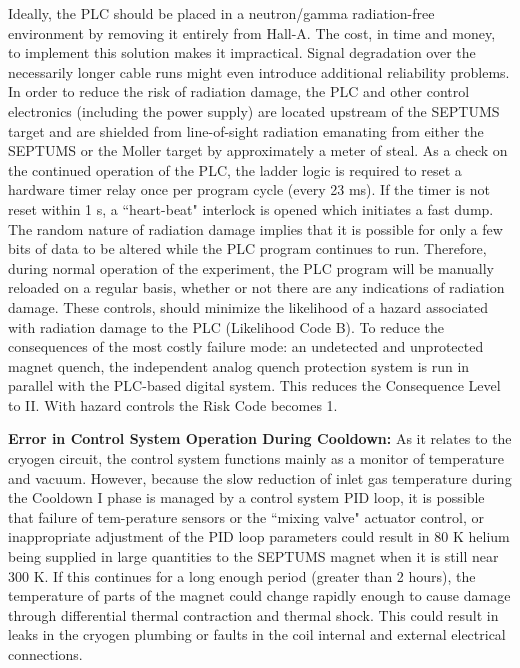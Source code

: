 {Ideally, the PLC should be placed in a neutron/gamma radiation-free environment by removing it entirely 
from Hall-A.  The cost, in time and money, to implement this solution makes it impractical.  Signal 
degradation over the necessarily longer cable runs might even introduce additional reliability problems.  
In order to reduce the risk of radiation damage, the PLC and other control electronics (including 
the power supply) are located upstream of the SEPTUMS target and are shielded from line-of-sight radiation 
emanating from either the SEPTUMS or the Moller target by approximately a meter of steal.  As a check on 
the continued operation of the PLC, the ladder logic is required to reset a hardware timer relay once per 
program cycle (every 23 ms).  If the timer is not reset within 1 s, a ``heart-beat" interlock is opened which 
initiates a fast dump.  The random nature of radiation damage implies that it is possible for only a few bits 
of data to be altered while the PLC program continues to run.  Therefore, during normal operation of the 
experiment, the PLC program will be manually reloaded on a regular basis, whether or not there are any 
indications of radiation damage.  These controls, should minimize the likelihood of a hazard associated 
with radiation damage to the PLC (Likelihood Code B).  To reduce the consequences of the most costly 
failure mode: an undetected and unprotected magnet quench, the independent analog quench protection system 
is run in parallel with the PLC-based digital system.  This reduces the Consequence Level to II. With 
hazard controls the Risk Code becomes 1.

{\bf Error in Control System Operation During Cooldown:}
As it relates to the cryogen circuit, the control system functions mainly as a monitor of temperature and 
vacuum.  However, because the slow reduction of inlet gas temperature during the Cooldown I phase is managed 
by a control system PID loop, it is possible that failure of tem-perature sensors or the ``mixing valve" 
actuator control, or inappropriate adjustment of the PID loop parameters could result in 80 K helium being 
supplied in large quantities to the SEPTUMS magnet when it is still near 300 K.  If this continues for a 
long enough period (greater than 2 hours), the temperature of parts of the magnet could change rapidly 
enough to cause damage through differential thermal contraction and thermal shock.  This could result in 
leaks in the cryogen plumbing or faults in the coil internal and external electrical connections.

}
